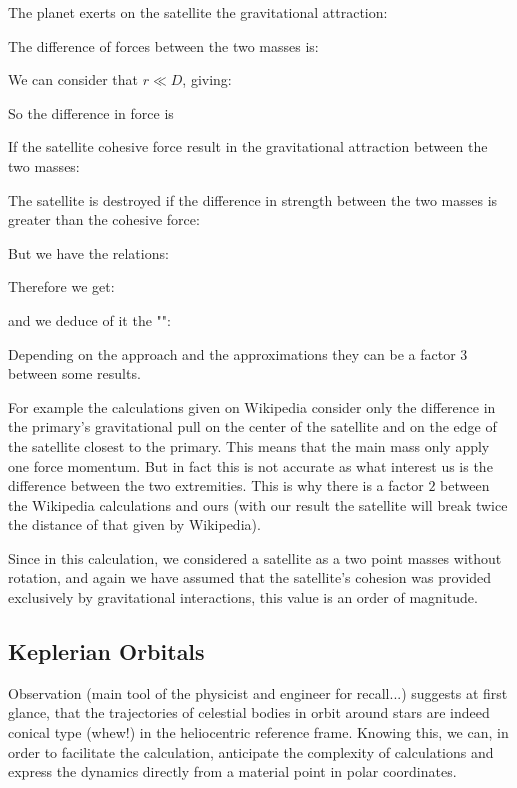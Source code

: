 	The planet exerts on the satellite the gravitational attraction:
	
	The difference of forces between the two masses is:
	
	We can consider that $r \ll D$, giving:
	
	So the difference in force is
	
	If the satellite cohesive force result in the gravitational attraction between the two masses:
	
	The satellite is destroyed if the difference in strength between the two masses is greater than the cohesive force:
	
	But we have the relations:
	
	Therefore we get:
	
	and we deduce of it the "":
	
	Depending on the approach and the approximations they can be a factor $3$ between some results.
	\begin{tcolorbox}[title=Remark,colframe=black,arc=10pt]
	For example the calculations given on Wikipedia consider only the difference in the primary's gravitational pull on the center of the satellite and on the edge of the satellite closest to the primary. This means that the main mass only apply one force momentum. But in fact this is not accurate as what interest us is the difference between the two extremities. This is why there is a factor $2$ between the Wikipedia calculations and ours (with our result the satellite will break twice the distance of that given by Wikipedia).
	\end{tcolorbox}
	
	Since in this calculation, we considered a satellite as a two point masses without rotation, and again we have assumed that the satellite's cohesion was provided exclusively by gravitational interactions, this value is an order of magnitude.
	
	\pagebreak
	\subsection{Keplerian Orbitals}
	Observation (main tool of the physicist and engineer for recall...) suggests at first glance, that the trajectories of celestial bodies in orbit around stars are indeed conical type (whew!) in the heliocentric reference frame. Knowing this, we can, in order to facilitate the calculation, anticipate the complexity of calculations and express the dynamics directly from a material point in polar coordinates.

